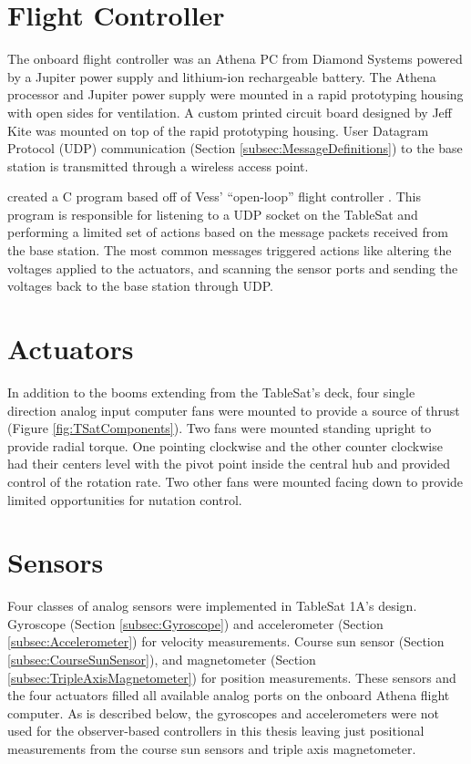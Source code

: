 \section{Flight Controller}
\label{sec:FlightController}

The onboard flight controller was an Athena PC from Diamond Systems powered by a Jupiter power supply and lithium-ion rechargeable battery.  The Athena processor and Jupiter power supply were mounted in a rapid prototyping housing with open sides for ventilation.  A custom printed circuit board designed by Jeff Kite  was mounted on top of the rapid prototyping housing.  User Datagram Protocol (UDP) communication (Section \ref{subsec:MessageDefinitions}) to the base station is transmitted through a wireless access point.

 created a C program based off of Vess' ``open-loop'' flight controller \cite{vessthesis} .  This program is responsible for listening to a UDP socket on the TableSat and performing a limited set of actions based on the message packets received from the base station.  The most common messages triggered actions like altering the voltages applied to the actuators, and scanning the sensor ports and sending the voltages back to the base station through UDP.

\section{Actuators}
\label{sec:Actuators}

In addition to the booms extending from the TableSat's deck, four single direction analog input computer fans were mounted to provide a source of thrust (Figure \ref{fig:TSatComponents}).  Two fans were mounted standing upright to provide radial torque.  One pointing clockwise and the other counter clockwise had their centers level with the pivot point inside the central hub and provided control of the rotation rate.  Two other fans were mounted facing down to provide limited opportunities for nutation control.

\section{Sensors}
\label{sec:Sensors}

Four classes of analog sensors were implemented in TableSat 1A's design. Gyroscope (Section \ref{subsec:Gyroscope}) and accelerometer (Section \ref{subsec:Accelerometer}) for velocity measurements.  Course sun sensor (Section \ref{subsec:CourseSunSensor}), and magnetometer (Section \ref{subsec:TripleAxisMagnetometer}) for position measurements.  These sensors and the four actuators filled all available analog ports on the onboard Athena flight computer.  As is described below, the gyroscopes and accelerometers were not used for the observer-based controllers in this thesis leaving just positional measurements from the course sun sensors and triple axis magnetometer.

